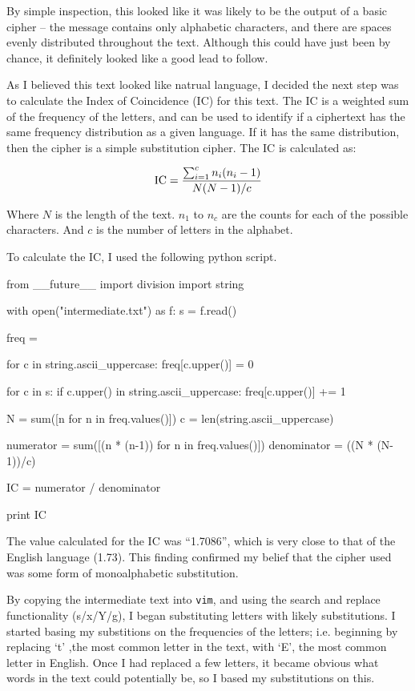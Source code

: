 \documentclass[12pt,a4paper,twoside]{article}
\begin{document}
By simple inspection, this looked like it was likely to be the output of a
basic cipher -- the message contains only alphabetic characters, and there are
spaces evenly distributed throughout the text. Although this could have just
been by chance, it definitely looked like a good lead to follow.

As I believed this text looked like natrual language, I decided the next step was
to calculate the Index of Coincidence (IC) for this text. The IC is a weighted
sum of the frequency of the letters, and can be used to identify if a
ciphertext has the same frequency distribution as a given language. If it has
the same distribution, then the cipher is a simple substitution cipher. The IC
is calculated as:

$$
\textup{IC} =  \frac{\sum_{i=1}^{c} n_i(n_i -1)}{N(N - 1)/c}
$$

Where $N$ is the length of the text. $n_1$ to $n_c$ are the counts
for each of the possible characters. And $c$ is the number of
letters in the alphabet. 

To calculate the IC, I used the following python script. 
\begin{python}
from __future__ import division
import string

with open("intermediate.txt") as f: 
    s = f.read()

    freq = {}

    for c in string.ascii_uppercase:
        freq[c.upper()] = 0

    for c in s:
        if c.upper() in string.ascii_uppercase:
            freq[c.upper()] += 1
                           
    N = sum([n for n in freq.values()])
    c = len(string.ascii_uppercase)

    numerator = sum([(n * (n-1)) for n in freq.values()]) 
    denominator = ((N * (N-1))/c)

    IC = numerator / denominator 

    print IC
\end{python}

The value calculated for the IC was ``1.7086'', which is very close to that of
the English language (1.73). This finding confirmed my belief that the cipher
used was some form of monoalphabetic substitution.  

By copying the intermediate text into {\tt vim}, and using the search and
replace functionality (s/x/Y/g), I began substituting letters with likely
substitutions. I started basing my substitions on the frequencies of the
letters; i.e. beginning by replacing `t' ,the most common letter in the text,
with `E', the most common letter in English. Once I had replaced a few letters,
it became obvious what words in the text could potentially be, so I based my
substitutions on this. 
\end{document}
